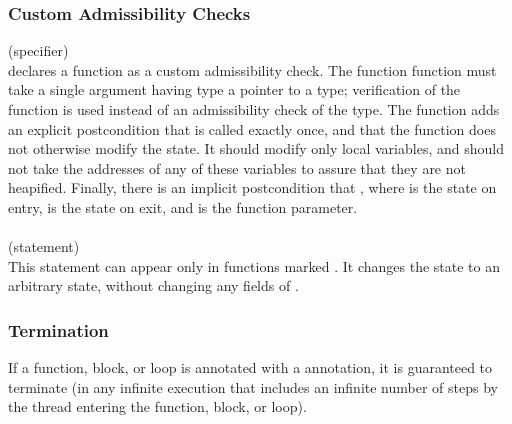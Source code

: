\documentclass[preprint,nocopyrightspace]{sigplanconf}
\begin{document}
{{{\subsubsection{Custom Admissibility Checks}
 (specifier)\\
 declares a function as a custom admissibility check. The function
function must take a single argument having type a pointer to a  type;
verification of the function is used instead of an admissibility check
of the  type. The function adds an explicit postcondition
that   is called exactly once, and that the
function does not otherwise modify the state. It should modify only
local variables, and should not take the addresses of any of these
variables to assure that they are not heapified. Finally, there is an
implicit postcondition that , where  is
the state on entry,  is the state on exit, and  is the
function parameter.
\\\\
 (statement)\\
This statement can appear only in functions
marked . It changes the state to an arbitrary
\vcc{\legal} state, without changing any fields of .

\subsubsection{Termination}
If a function, block, or loop is annotated with a 
annotation, it is guaranteed to terminate (in any infinite execution
that includes an infinite number of steps by the thread entering the
function, block, or loop).

}}}
\end{document}
